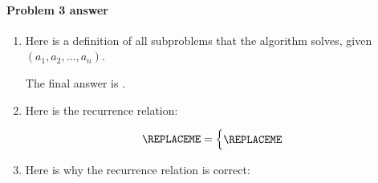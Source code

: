 \paragraph{Problem 3 answer}

\begin{enumerate}[label=(\alph*)]

  \item   %

    Here is a definition of all subproblems that the algorithm solves, given $(a_1, a_2, \ldots, a_n)$.

    \begin{blue}
      \REPLACEME
    \end{blue}

    The final answer is \BLUE{\( \REPLACEME \)}.

  \item %

    Here is the recurrence relation:

    \begin{blue}
      \[\REPLACEME =
        \begin{cases}
          \REPLACEME
        \end{cases}
      \]
    \end{blue}
    

\item %

  Here is why the recurrence relation is correct:

  \begin{blue}
    \REPLACEME
  \end{blue}
  
\end{enumerate}

